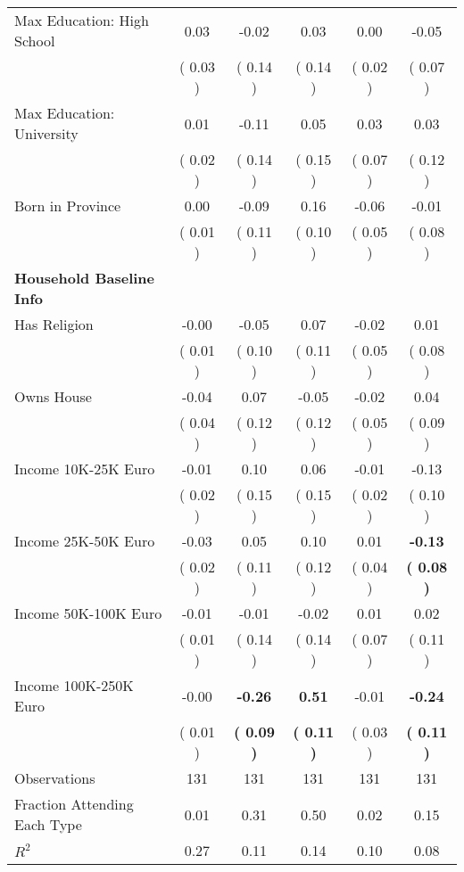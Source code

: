 \begin{table}[H]
{\begin{tabular}{lccccc}
\quad Max Education: High School &      0.03 &     -0.02 &      0.03 &      0.00 &     -0.05 \\
\quad  & (     0.03 ) & (     0.14 )  & (     0.14 )  & (     0.02 ) & (     0.07 ) \\
\quad Max Education: University &      0.01 &     -0.11 &      0.05 &      0.03 &      0.03 \\
\quad  & (     0.02 ) & (     0.14 )  & (     0.15 )  & (     0.07 ) & (     0.12 ) \\
\quad Born in Province &      0.00 &     -0.09 &      0.16 &     -0.06 &     -0.01 \\
\quad  & (     0.01 ) & (     0.11 )  & (     0.10 )  & (     0.05 ) & (     0.08 ) \\
\midrule
\textbf{Household Baseline Info} \\
\quad Has Religion &     -0.00 &     -0.05 &      0.07 &     -0.02 &      0.01 \\
\quad  & (     0.01 ) & (     0.10 )  & (     0.11 )  & (     0.05 ) & (     0.08 ) \\
\quad Owns House &     -0.04 &      0.07 &     -0.05 &     -0.02 &      0.04 \\
\quad  & (     0.04 ) & (     0.12 )  & (     0.12 )  & (     0.05 ) & (     0.09 ) \\
\quad Income 10K-25K Euro &     -0.01 &      0.10 &      0.06 &     -0.01 &     -0.13 \\
\quad  & (     0.02 ) & (     0.15 )  & (     0.15 )  & (     0.02 ) & (     0.10 ) \\
\quad Income 25K-50K Euro &     -0.03 &      0.05 &      0.10 &      0.01 & \textbf{    -0.13} \\
\quad  & (     0.02 ) & (     0.11 )  & (     0.12 )  & (     0.04 ) & \textbf{(     0.08 )} \\
\quad Income 50K-100K Euro &     -0.01 &     -0.01 &     -0.02 &      0.01 &      0.02 \\
\quad  & (     0.01 ) & (     0.14 )  & (     0.14 )  & (     0.07 ) & (     0.11 ) \\
\quad Income 100K-250K Euro &     -0.00 & \textbf{    -0.26} & \textbf{     0.51} &     -0.01 & \textbf{    -0.24} \\
\quad  & (     0.01 ) & \textbf{(     0.09 )}  & \textbf{(     0.11 )}  & (     0.03 ) & \textbf{(     0.11 )} \\
\midrule
Observations & 131 & 131 & 131 & 131 & 131 \\
Fraction Attending Each Type &      0.01 &      0.31 &      0.50 &      0.02 &      0.15 \\
\midrule
$ R^2$ &      0.27 &      0.11 &      0.14 &      0.10 &      0.08 \\
\bottomrule
\end{tabular}}
\end{table}

